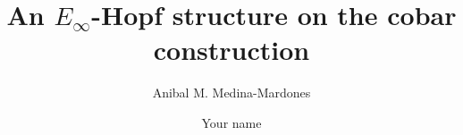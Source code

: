 \documentclass{amsart}
\begin{document}
\title{An $E_\infty$-Hopf structure on the cobar construction}
\author{Anibal M. Medina-Mardones}
\address{Max Plank Institute for Mathematics, Bonn, Germany}
\address{Department of Mathematics, University of Notre Dame, Notre Dame, IN, USA}
\author{Your name}
\address{Your address}


\begin{abstract}
	
\end{abstract} 

\vspace*{-1cm}

\maketitle

\tableofcontents






 


\end{document}
